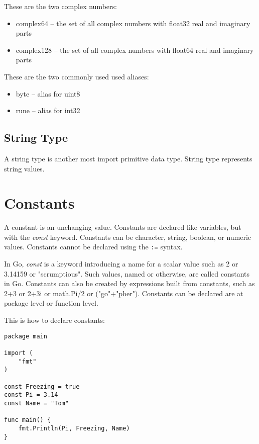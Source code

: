 These are the two complex numbers:

\begin{itemize}
\item complex64 -- the set of all complex numbers with float32 real and imaginary parts
\item complex128 -- the set of all complex numbers with float64 real and imaginary parts
\end{itemize}

These are the two commonly used used aliases:

\begin{itemize}
\item byte -- alias for uint8
\item rune -- alias for int32
\end{itemize}

\subsection{String Type}

A string type is another most import primitive data type.  String type
represents string values.

\section{Constants}

A constant is an unchanging value.  Constants are
declared like variables, but with the \textit{const} keyword.
Constants can be character, string, boolean, or numeric values.
Constants cannot be declared using the \texttt{:=} syntax.

In Go, \textit{const} is a keyword introducing a name for a scalar
value such as 2 or 3.14159 or "scrumptious".  Such values, named or
otherwise, are called constants in Go.  Constants can also be created
by expressions built from constants, such as 2+3 or 2+3i or math.Pi/2
or ("go"+"pher").  Constants can be declared are at package level or
function level.

This is how to declare constants:

\begin{lstlisting}[numbers=none]
package main

import (
    "fmt"
)

const Freezing = true
const Pi = 3.14
const Name = "Tom"

func main() {
    fmt.Println(Pi, Freezing, Name)
}
\end{lstlisting}

